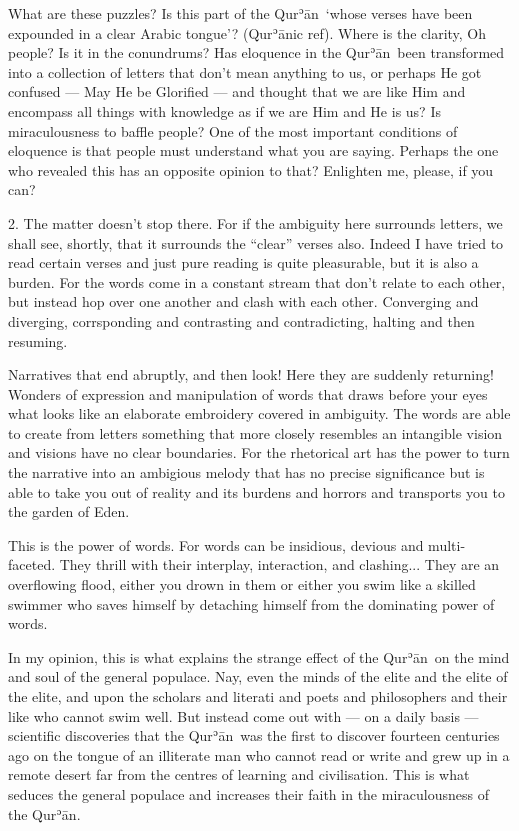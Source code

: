 \documentclass[12pt]{memoir}
\def\´{ʾ} %
\def \Quran{Qur\-\´ān} %
\def\–{-\hskip0pt}
\begin{document}
What are these puzzles?
Is this part of the \Quran\
‘whose verses have been expounded in a clear Arabic tongue’?
(\Quran{}ic ref).
Where is the clarity, Oh people?
Is it in the conundrums?
Has eloquence in the \Quran\ been transformed into a collection
of letters that don’t mean anything to us,
or perhaps He got confused — May He be Glorified —
and thought that we are like Him and encompass all things with knowledge
as if we are Him and He is us? Is miraculousness to baffle people?
One of the most important conditions of eloquence is
that people must understand what you are saying.
Perhaps the one who revealed this has an opposite opinion to that?
Enlighten me, please, if you can?

2. The matter doesn’t stop there. For if the ambiguity here surrounds letters,
we shall see, shortly, that it surrounds the “clear” verses also.
Indeed I have tried to read certain verses and just pure reading
is quite pleasurable, but it is also a burden.
For the words come in a constant stream that don’t relate to each other,
but instead hop over one another and clash with each other.
Converging and diverging, corrsponding and contrasting and contradicting,
halting and then resuming.

Narratives that end abruptly, and then look!
Here they are suddenly returning!
Wonders of expression and manipulation of words that draws before your eyes
what looks like an elaborate embroidery covered in ambiguity.
The words are able to create from letters something
that more closely resembles an intangible vision
and visions have no clear boundaries.
For the rhetorical art has the power to turn the narrative
into an ambigious melody that has no precise significance
but is able to take you out of reality and its burdens
and horrors and transports you to the garden of Eden.

This is the power of words.
For words can be insidious, devious and multi\–faceted.
They thrill with their interplay, interaction, and clashing...
They are an overflowing flood, either you drown in them
or either you swim like a skilled swimmer who saves himself
by detaching himself from the dominating power of words.

In my opinion, this is what explains the strange effect of the \Quran\
on the mind and soul of the general populace.
Nay, even the minds of the elite and the elite of the elite,
and upon the scholars and literati and poets
and philosophers and their like who cannot swim well.
But instead come out with — on a daily basis — scientific discoveries that
the \Quran\ was the first to discover fourteen centuries ago on the tongue
of an illiterate man who cannot read or write and grew up in a remote desert
far from the centres of learning and civilisation.
This is what seduces the general populace and increases
their faith in the miraculousness of the \Quran.
\end{document}
